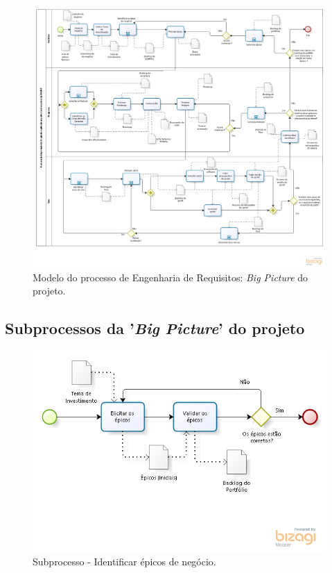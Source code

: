   
  \begin{figure}[!htbp]
  \centering
  \includegraphics[scale=0.5, angle = 90]{editaveis/figuras/project_big_picture}
  \caption[Modelo do processo de Engenharia de Requisitos: \textit{Big Picture} do projeto]
      {Modelo do processo de Engenharia de Requisitos: \textit{Big Picture} do projeto.}
  \label{project_big_picture}
  \end{figure}
  
  \pagebreak
  \subsection{Subprocessos da '\textit{Big Picture}' do projeto}

    \begin{figure}[!htbp]
      \centering
      \includegraphics[scale=0.55]{editaveis/figuras/processo_identificar_epicos}
      \caption[Subprocesso - Identificar épicos de negócio]{Subprocesso - Identificar épicos de negócio.}
      \label{processo_identificar_epicos}
    \end{figure}

